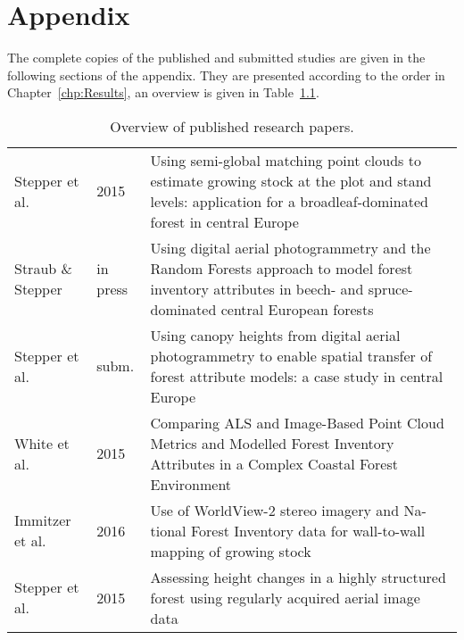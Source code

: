 \chapter{Appendix}

The complete  copies of the published and submitted studies 
are given in the following sections of the appendix. 
They are presented according to the order in Chapter~\ref{chp:Results}, an overview is given in Table~\ref{tab:steppchr_papers}.

\begin{table}[h]
	\myfloatalign
	\caption[Overview of published research papers.]{Overview of published research papers.}
	\begin{tabularx}{\textwidth}{llX} \toprule
		\tableheadline{Authors} & \tableheadline{Year} & \tableheadline{Title}  \\ 
		\midrule
		Stepper et al. & 2015 & Using
		semi-global matching point clouds to estimate growing stock at the
		plot and stand levels: application for a broadleaf-dominated forest in
		central Europe \\
		Straub \& Stepper & in press & Using digital aerial
		photogrammetry and the Random Forests approach to model forest
		inventory attributes in beech- and spruce-dominated central European
		forests \\
		Stepper et al. & subm. & Using
		canopy heights from digital aerial photogrammetry to enable spatial
		transfer of forest attribute models: a case study in central Europe \\
		White et al. & 2015 & Comparing ALS and Image-Based Point
		Cloud Metrics and Modelled Forest Inventory Attributes in a Complex
		Coastal Forest Environment \\
		Immitzer et al. & 2016 & Use of WorldView-2 stereo imagery and Na-
		tional Forest Inventory data for wall-to-wall mapping of growing stock \\
		Stepper et al. & 2015 & Assessing
		height changes in a highly structured forest using regularly acquired
		aerial image data \\
		\bottomrule
	\end{tabularx}
	\label{tab:steppchr_papers}
\end{table}

